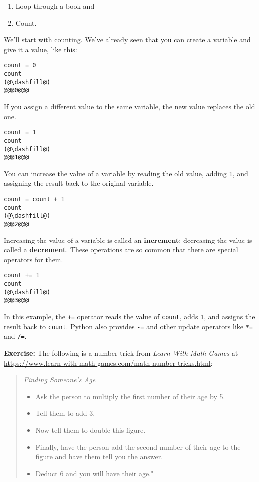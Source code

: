 \begin{enumerate}
\def\labelenumi{\arabic{enumi}.}
\item
  Loop through a book and
\item
  Count.
\end{enumerate}

We'll start with counting. We've already seen that you can create a
variable and give it a value, like this:

\begin{lstlisting}[]
count = 0
count
(@\dashfill@)
@@@0@@@
\end{lstlisting}

If you assign a different value to the same variable, the new value
replaces the old one.

\begin{lstlisting}[]
count = 1
count
(@\dashfill@)
@@@1@@@
\end{lstlisting}

You can increase the value of a variable by reading the old value,
adding \passthrough{\lstinline!1!}, and assigning the result back to the
original variable.

\begin{lstlisting}[]
count = count + 1
count
(@\dashfill@)
@@@2@@@
\end{lstlisting}

Increasing the value of a variable is called an \textbf{increment};
decreasing the value is called a \textbf{decrement}. These operations
are so common that there are special operators for them.

\begin{lstlisting}[]
count += 1
count
(@\dashfill@)
@@@3@@@
\end{lstlisting}

In this example, the \passthrough{\lstinline!+=!} operator reads the
value of \passthrough{\lstinline!count!}, adds
\passthrough{\lstinline!1!}, and assigns the result back to
\passthrough{\lstinline!count!}. Python also provides
\passthrough{\lstinline!-=!} and other update operators like
\passthrough{\lstinline!*=!} and \passthrough{\lstinline!/=!}.

\textbf{Exercise:} The following is a number trick from \emph{Learn With
Math Games} at
\url{https://www.learn-with-math-games.com/math-number-tricks.html}:

\begin{quote}
\emph{Finding Someone's Age}

\begin{itemize}
\item
  Ask the person to multiply the first number of their age by 5.
\item
  Tell them to add 3.
\item
  Now tell them to double this figure.
\item
  Finally, have the person add the second number of their age to the
  figure and have them tell you the answer.
\item
  Deduct 6 and you will have their age."
\end{itemize}
\end{quote}

